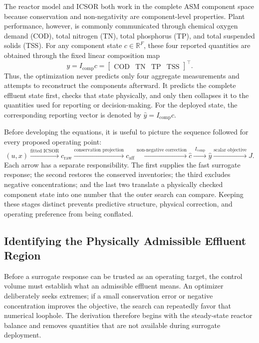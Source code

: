 \documentclass[a4paper,fleqn]{cas-sc}
\newcommand{\R}{\mathbb{R}}
\begin{document}
The reactor model and ICSOR both work in the complete ASM component space because conservation and non-negativity are component-level properties. Plant performance, however, is commonly communicated through chemical oxygen demand (COD), total nitrogen (TN), total phosphorus (TP), and total suspended solids (TSS). For any component state $c\in\R^F$, these four reported quantities are obtained through the fixed linear composition map
\begin{equation}
\label{eq:reported_composites}
y=I_{\mathrm{comp}}c
=\begin{bmatrix}\mathrm{COD}&\mathrm{TN}&\mathrm{TP}&\mathrm{TSS}\end{bmatrix}^{\!\top}.
\end{equation}
Thus, the optimization never predicts only four aggregate measurements and attempts to reconstruct the components afterward. It predicts the complete effluent state first, checks that state physically, and only then collapses it to the quantities used for reporting or decision-making. For the deployed state, the corresponding reporting vector is denoted by $\widehat y=I_{\mathrm{comp}}\widehat c$.

Before developing the equations, it is useful to picture the sequence followed for every proposed operating point:
\begin{equation}
\label{eq:optimization_chain}
(u,x)
\xrightarrow{\text{fitted ICSOR}}
c_{\mathrm{raw}}
\xrightarrow{\text{conservation projection}}
c_{\mathrm{aff}}
\xrightarrow{\text{non-negative correction}}
\widehat c
\xrightarrow{\ I_{\mathrm{comp}}\ }
\widehat y
\xrightarrow{\text{scalar objective}}
J.
\end{equation}
Each arrow has a separate responsibility. The first supplies the fast surrogate response; the second restores the conserved inventories; the third excludes negative concentrations; and the last two translate a physically checked component state into one number that the outer search can compare. Keeping these stages distinct prevents predictive structure, physical correction, and operating preference from being conflated.

\subsection{Identifying the Physically Admissible Effluent Region}

Before a surrogate response can be trusted as an operating target, the control volume must establish what an admissible effluent means. An optimizer deliberately seeks extremes; if a small conservation error or negative concentration improves the objective, the search can repeatedly favor that numerical loophole. The derivation therefore begins with the steady-state reactor balance and removes quantities that are not available during surrogate deployment.
\end{document}
